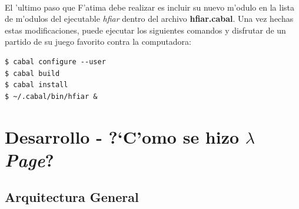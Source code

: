 \documentclass[a4paper]{article}
\newcommand{\hpage}{\textbf{\textsl{$\lambda$Page}}}
\begin{document}
\paragraph{}El 'ultimo paso que F'atima debe realizar es incluir su nuevo m'odulo en la lista de m'odulos del ejecutable \textsl{hfiar} dentro del archivo \textbf{hfiar.cabal}.  Una vez hechas estas modificaciones, puede ejecutar los siguientes comandos y disfrutar de un partido de su juego favorito contra la computadora:
\begin{center}\begin{lstlisting}
$ cabal configure --user
$ cabal build
$ cabal install
$ ~/.cabal/bin/hfiar &
\end{lstlisting}\end{center}

\newpage
\section{Desarrollo - ?`C'omo se hizo \hpage?}
\subsection{Arquitectura General}
\begin{epigraphs}
\end{epigraphs}
\end{document}
